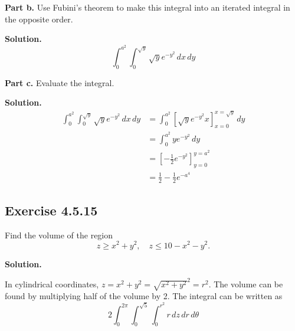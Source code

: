 \documentclass{article}
\begin{document}
\textbf{Part b.}
Use Fubini's theorem to make this integral into an iterated integral in the opposite order.
\medskip 

\textbf{Solution.}
\[
    \int_{0}^{a^2} \int_{0}^{\sqrt{y}} \sqrt{y} e^{-y^2} \,dx \,dy
\]
\bigskip

\textbf{Part c.}
Evaluate the integral.
\medskip 

\textbf{Solution.}
\begin{align*}
    \int_{0}^{a^2} \int_{0}^{\sqrt{y}} \sqrt{y} e^{-y^2} \,dx \,dy
    &= \int_{0}^{a^2} \left[ \sqrt{y} e^{-y^2}x \right]_{x=0}^{x=\sqrt{y}} \,dy \\
    &= \int_{0}^{a^2} y e^{-y^2}  \,dy \\ 
    &= \left[ -\frac{1}{2}e^{-y^2} \right]_{y=0}^{y=a^2} \\
    &= \frac{1}{2}-\frac{1}{2}e^{-a^4}
\end{align*}
\newpage

\subsection*{Exercise 4.5.15}
Find the volume of the region
$$z \geq x^2 + y^2 , \quad  z \leq 10 - x^2 - y^2 . $$
\medskip 

\textbf{Solution.}


In cylindrical coordinates, 
$z=x^2+y^2 = \sqrt{x^2+y^2}^2 = r^2$.
The volume can be found by multiplying half of the volume by 2.
The integral can be written as
\[
    2\int_{0}^{2\pi} 
    \int_{0}^{\sqrt{5}} 
    \int_{0}^{r^2} 
    r \,dz \,dr \,d\theta
\]
\end{document}
